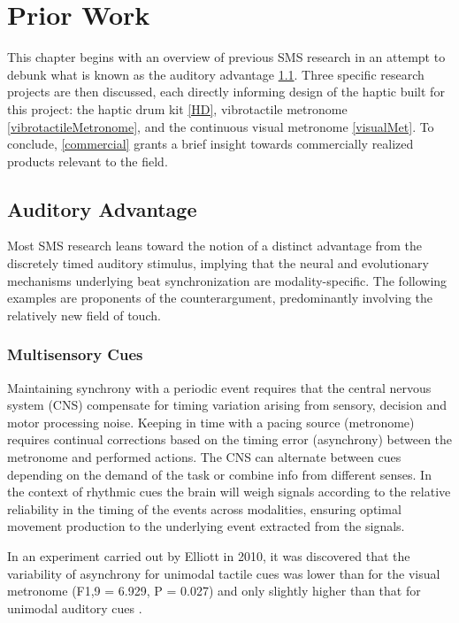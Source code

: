 \chapter{Prior Work}

This chapter begins with an overview of previous SMS research in an attempt to debunk what is known as the auditory advantage \ref{AudAdv}. Three specific research projects are then discussed, each directly informing design of the haptic built for this project: the haptic drum kit \ref{HD}, vibrotactile metronome \ref{vibrotactileMetronome}, and the continuous visual metronome \ref{visualMet}. To conclude, \ref{commercial} grants a brief insight towards commercially realized products relevant to the field.

\section{Auditory Advantage} \label{AudAdv}
Most SMS research leans toward the notion of a distinct advantage from the discretely timed auditory stimulus, implying that the neural and evolutionary mechanisms underlying beat synchronization are modality-specific. The following examples are proponents of the counterargument, predominantly involving the relatively new field of touch.

\subsection{Multisensory Cues}
Maintaining synchrony with a periodic event requires that the central nervous system (CNS) compensate for timing variation arising from sensory, decision and motor processing noise. Keeping in time with a pacing source (metronome) requires continual corrections based on the timing error (asynchrony) between the metronome and performed actions. The CNS can alternate between cues depending on the demand of the task or combine info from different senses. In the context of rhythmic cues the brain will weigh signals according to the relative reliability in the timing of the events across modalities, ensuring optimal movement production to the underlying event extracted from the signals.

In an experiment carried out by Elliott in 2010, it was discovered that the variability of asynchrony for unimodal tactile cues was lower than for the visual metronome (F1,9 = 6.929, P = 0.027) and only slightly higher than that for unimodal auditory cues \cite{elliott2010multisensory}.

